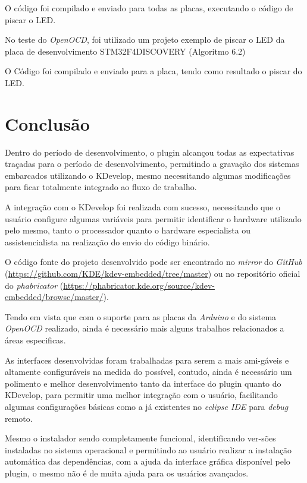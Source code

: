 

O código foi compilado e enviado para todas as placas, executando o código de piscar o LED.

No teste do \textit{OpenOCD}, foi utilizado um projeto exemplo de piscar o LED da placa de desenvolvimento STM32F4DISCOVERY (Algoritmo 6.2)



O Código foi compilado e enviado para a placa, tendo como resultado o piscar do LED.

\chapter{Conclusão}
Dentro do período de desenvolvimento, o plugin alcançou todas as expectativas traçadas para o período de desenvolvimento,
permitindo a gravação dos sistemas embarcados utilizando o KDevelop, mesmo necessitando algumas modificações para ficar
totalmente integrado ao fluxo de trabalho.

A integração com o KDevelop foi realizada com sucesso, necessitando que o usuário configure algumas variáveis para permitir identificar o hardware utilizado pelo mesmo, tanto o processador quanto o hardware especialista ou assistencialista na realização do envio do código binário.

O código fonte do projeto desenvolvido pode ser encontrado no \textit{mirror} do \textit{GitHub} (\url{https://github.com/KDE/kdev-embedded/tree/master}) ou no repositório oficial do \textit{phabricator} (\url{https://phabricator.kde.org/source/kdev-embedded/browse/master/}).

Tendo em vista que com o suporte para as placas da \textit{Arduino} e do sistema \textit{OpenOCD} realizado, ainda é necessário mais alguns trabalhos relacionados a áreas especificas.

As interfaces desenvolvidas foram trabalhadas para serem a mais ami-gáveis e altamente configuráveis na medida do possível, contudo, ainda é necessário um polimento e melhor desenvolvimento tanto da interface do plugin quanto do KDevelop, para permitir uma melhor integração com o usuário, facilitando algumas configurações básicas como a já existentes no \textit{eclipse IDE} para \textit{debug} remoto.

Mesmo o instalador sendo completamente funcional, identificando ver-sões instaladas no sistema operacional e
permitindo ao usuário realizar a instalação automática das dependências, com a ajuda da interface gráfica disponível pelo plugin, o mesmo não é de muita ajuda para os usuários avançados.

